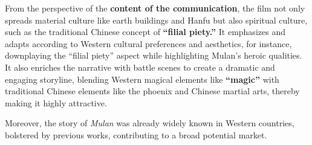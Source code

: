 From the perspective of the \textbf{content of the communication}, the film not only spreads material culture like earth buildings and Hanfu but also spiritual culture, such as the traditional Chinese concept of \textbf{``filial piety.''} It emphasizes and adapts according to Western cultural preferences and aesthetics, for instance, downplaying the ``filial piety'' aspect while highlighting Mulan's heroic qualities. It also enriches the narrative with battle scenes to create a dramatic and engaging storyline, blending Western magical elements like \textbf{``magic''} with traditional Chinese elements like the phoenix and Chinese martial arts, thereby making it highly attractive.

Moreover, the story of \textit{Mulan} was already widely known in Western countries, bolstered by previous works, contributing to a broad potential market.


